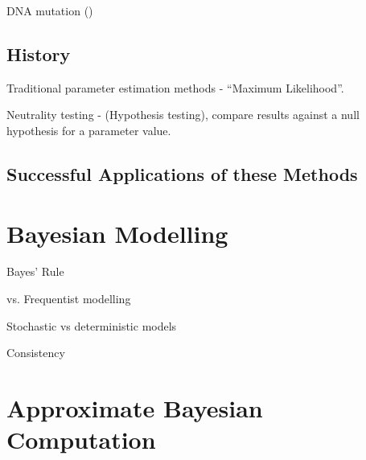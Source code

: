 \documentclass[11pt,a4paper,margin=0]{article}
\theoremstyle{break}
\begin{document}
  \par DNA mutation (\cite[]{modern_computational_approaches_for_analysing_molecular_genetic_variation_data})

\subsection*{History}\label{sec_history}

  \par Traditional parameter estimation methods - ``Maximum Likelihood''.
  \par Neutrality testing - (Hypothesis testing), compare results against a null hypothesis for a parameter value.

\subsection*{Successful Applications of these Methods}\label{sec_successful_applications}

\section{Bayesian Modelling}

  \par Bayes' Rule
  \par vs. Frequentist modelling
  \par Stochastic vs deterministic models
  \par Consistency

\newpage
\section{Approximate Bayesian Computation}\label{sec_ABC}
\end{document}
